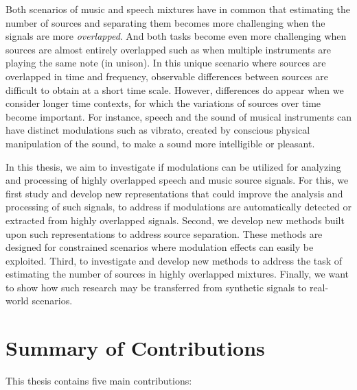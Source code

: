 \par
Both scenarios of music and speech mixtures have in common that estimating the number of sources and separating them becomes more challenging when the signals are more \emph{overlapped}.
And both tasks become even more challenging when sources are almost entirely overlapped such as when multiple instruments are playing the same note (in unison).
In this unique scenario where sources are overlapped in time and frequency,
observable differences between sources are difficult to obtain at a short time scale.
However, differences do appear when we consider longer time contexts, for which the variations of sources over time become important.
For instance, speech and the sound of musical instruments can have distinct modulations such as vibrato, created by conscious physical manipulation of the sound, to make a sound more intelligible or pleasant.
\par
In this thesis, we aim to investigate if modulations can be utilized for analyzing and processing of highly overlapped speech and music source signals.
For this, we first study and develop new representations that could improve the analysis and processing of such signals, to address if modulations are automatically detected or extracted from highly overlapped signals.
Second, we develop new methods built upon such representations to address source separation. 
These methods are designed for constrained scenarios where modulation effects can easily be exploited.
Third, to investigate and develop new methods to address the task of estimating the number of sources in highly overlapped mixtures.
Finally, we want to show how such research may be transferred from synthetic signals to real-world scenarios.

\section{Summary of Contributions}

This thesis contains five main contributions:

